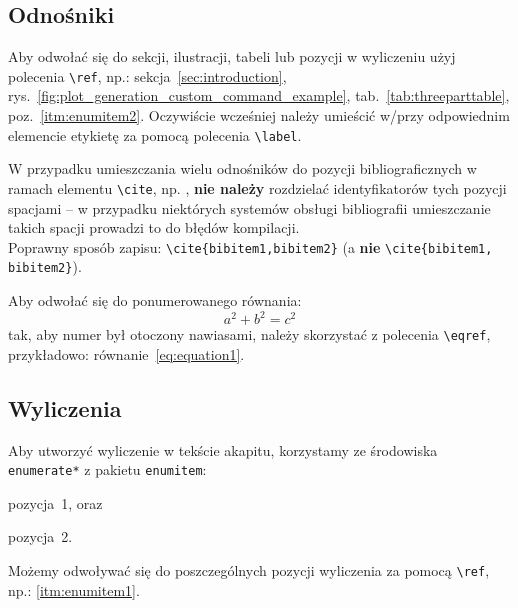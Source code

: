 \documentclass[pdftex,11pt,a4paper]{article}
\begin{document}
\subsection{Odnośniki}
\label{sub:references}

Aby odwołać się do sekcji, ilustracji, tabeli lub pozycji w wyliczeniu użyj polecenia \lstinline|\ref|, np.:
sekcja~\ref{sec:introduction}, rys.~\ref{fig:plot_generation_custom_command_example}, tab.~\ref{tab:threeparttable}, poz.~\ref{itm:enumitem2}.
Oczywiście wcześniej należy umieścić w/przy odpowiednim elemencie etykietę za pomocą polecenia \lstinline|\label|.

\par\bigskip

W przypadku umieszczania wielu odnośników do pozycji bibliograficznych w ramach elementu \lstinline|\cite|, np. \cite{bibitem1,bibitem2}, \textbf{nie należy} rozdzielać identyfikatorów tych pozycji spacjami -- w przypadku niektórych systemów obsługi bibliografii umieszczanie takich spacji prowadzi to do błędów kompilacji.\\
Poprawny sposób zapisu: \lstinline|\cite{bibitem1,bibitem2}| (a \textbf{nie} \lstinline|\cite{bibitem1, bibitem2}|).

\par\bigskip


Aby odwołać się do ponumerowanego równania:
\begin{equation}\label{eq:equation1}
a^2 + b^2 = c^2
\end{equation}
tak, aby numer był otoczony nawiasami, należy skorzystać z polecenia \lstinline|\eqref|, przykładowo: równanie~\eqref{eq:equation1}.

\subsection{Wyliczenia}
\label{sub:enumerations}

Aby utworzyć wyliczenie w tekście akapitu, korzystamy ze środowiska \verb|enumerate*| z pakietu \verb|enumitem|:
\begin{enumerate*}[(1)]
	\item\label{itm:enumitem1} pozycja~1, oraz
	\item\label{itm:enumitem2} pozycja~2.
\end{enumerate*}
Możemy odwoływać się do poszczególnych pozycji wyliczenia za pomocą \lstinline|\ref|, np.: \ref{itm:enumitem1}.
\end{document}

